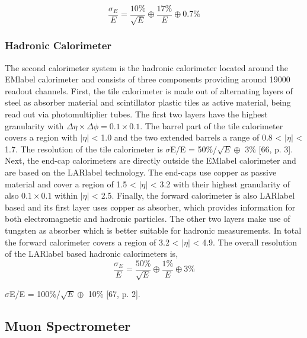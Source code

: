 \begin{equation}
    \frac{\sigma_E}{E} = \frac{10\%}{\sqrt{E}}\oplus\frac{17\%}{E}\oplus 0.7\%
\end{equation}


\subsubsection*{Hadronic Calorimeter}

The second calorimeter system is the hadronic calorimeter located around the \acrshort{EMlabel} calorimeter and consists of three components providing around 19000 readout channels. First, the tile calorimeter is made out of alternating layers of steel as absorber material and scintillator plastic tiles as active material, being read out via photomultiplier tubes. The first two layers have the highest granularity with $\Delta\eta\times\Delta\phi= 0.1\times 0.1$. The barrel part of the tile calorimeter covers a region with $|\eta|$ < 1.0 and the two extended barrels a range of 0.8 < $|\eta|$ < 1.7. The resolution of the tile calorimeter is $\sigma$E/E = 50\%/$\sqrt{E}\oplus$ 3\%  [66, p. 3].
Next, the end-cap calorimeters are directly outside the \acrshort{EMlabel} calorimeter and are based on the \acrshort{LARlabel} technology. The end-caps use copper as passive material and cover a region of 1.5 < $|\eta|$ < 3.2 with their highest granularity of also $0.1\times 0.1$ within $|\eta|$ < 2.5. Finally, the forward calorimeter is also \acrshort{LARlabel} based and its first layer uses copper as absorber, which provides information for both electromagnetic and hadronic particles. The other two layers make use of tungsten as absorber which is better suitable for hadronic measurements. In total the forward calorimeter covers a region of 3.2 < $|\eta|$ < 4.9. The overall resolution of the \acrshort{LARlabel} based hadronic calorimeters is,
\begin{equation}
    \frac{\sigma_E}{E} = \frac{50\%}{\sqrt{E}}\oplus\frac{1\%}{E}\oplus 3\%
\end{equation}


$\sigma$E/E = 100\%/$\sqrt{E}\oplus$ 10\% [67, p. 2].


\subsection{Muon Spectrometer}

